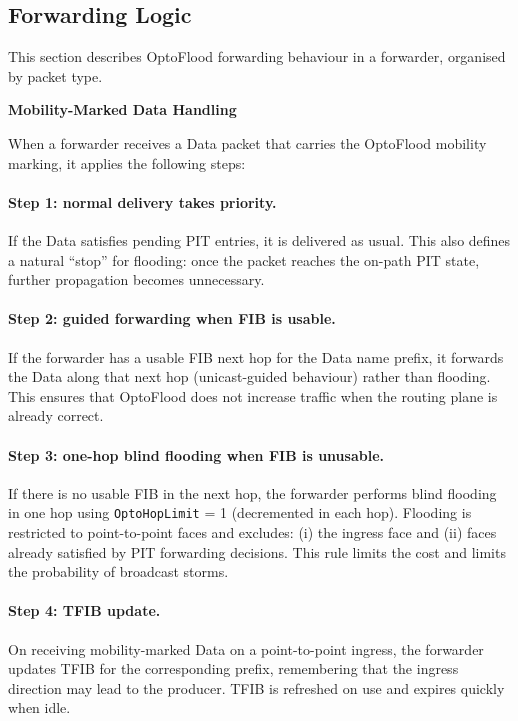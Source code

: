 \subsection{Forwarding Logic}
This section describes OptoFlood forwarding behaviour in a forwarder, organised by packet type.

\textbf{Mobility-Marked Data Handling}

When a forwarder receives a Data packet that carries the OptoFlood mobility marking, it applies the following steps:

\paragraph{Step 1: normal delivery takes priority.}
If the Data satisfies pending PIT entries, it is delivered as usual.
This also defines a natural ``stop'' for flooding: once the packet reaches the on-path PIT state, further propagation becomes unnecessary.

\paragraph{Step 2: guided forwarding when FIB is usable.}
If the forwarder has a usable FIB next hop for the Data name prefix, it forwards the Data along that next hop (unicast-guided behaviour) rather than flooding.
This ensures that OptoFlood does not increase traffic when the routing plane is already correct.

\paragraph{Step 3: one-hop blind flooding when FIB is unusable.}
If there is no usable FIB in the next hop, the forwarder performs blind flooding in one hop using \texttt{OptoHopLimit} = 1 (decremented in each hop). Flooding is restricted to point-to-point faces and excludes: (i) the ingress face and (ii) faces already satisfied by PIT forwarding decisions. This rule limits the cost and limits the probability of broadcast storms.

\paragraph{Step 4: TFIB update.}
On receiving mobility-marked Data on a point-to-point ingress, the forwarder updates TFIB for the corresponding prefix, remembering that the ingress direction may lead to the producer.
TFIB is refreshed on use and expires quickly when idle.

